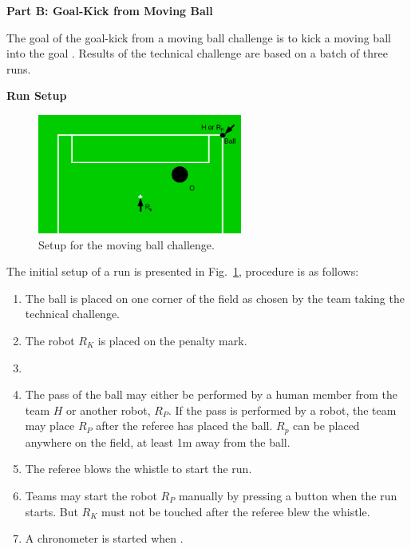\clearpage
\sffamily
{\bfseries\color[rgb]{0.4,0.4,0.4}
Part B: Goal-Kick from Moving Ball}
{}


\bigskip

The goal of the goal-kick from a moving ball challenge is to kick a moving ball
into the goal .
Results of the technical challenge are based on a batch of three runs.

\bigskip

{\bfseries Run Setup}

\smallskip

\begin{figure}[h]
\begin{center}
\includegraphics[width=0.6\textwidth]{img/tc_dynamic_kick.png}
\caption{\label{fig:tc_dynamic_kick}Setup for the moving ball challenge.}
\end{center}
\end{figure}

The initial setup of a run is presented in Fig.~\ref{fig:tc_dynamic_kick},
procedure is as follows:


\begin{enumerate}
\item The ball is placed on one corner of the field as chosen by the team taking the
technical challenge.
\item The robot $R_K$ is placed on the penalty mark.
\item {}
\item The pass of the ball may either be performed by a human member from the
team $H$ or another robot, $R_P$. If the pass is performed by a robot, the team
may place $R_P$ after the referee has placed the ball. $R_p$ can be placed
anywhere on the field, at least 1m away from the ball.
\item The referee blows the whistle to start the run.
\item Teams may start the robot $R_P$ manually by pressing a button when the
  run starts. But $R_K$ must not be touched after the referee blew the whistle.
\item A chronometer is started when 
  .
\end{enumerate}

